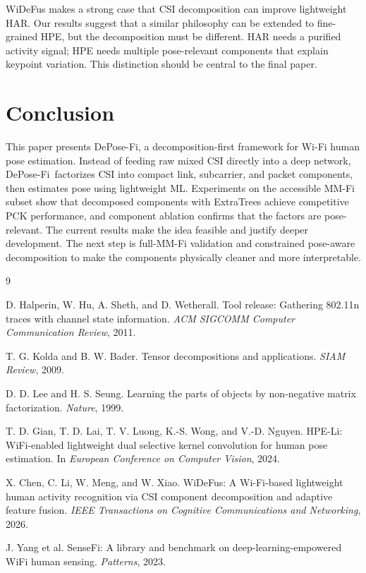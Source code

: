 \documentclass[letterpaper]{article}
\newcommand{\method}{DePose-Fi}
\begin{document}
WiDeFus makes a strong case that CSI decomposition can improve lightweight HAR. Our results suggest that a similar philosophy can be extended to fine-grained HPE, but the decomposition must be different. HAR needs a purified activity signal; HPE needs multiple pose-relevant components that explain keypoint variation. This distinction should be central to the final paper.

\section{Conclusion}

This paper presents \method, a decomposition-first framework for Wi-Fi human pose estimation. Instead of feeding raw mixed CSI directly into a deep network, \method\ factorizes CSI into compact link, subcarrier, and packet components, then estimates pose using lightweight ML. Experiments on the accessible MM-Fi subset show that decomposed components with ExtraTrees achieve competitive PCK performance, and component ablation confirms that the factors are pose-relevant. The current results make the idea feasible and justify deeper development. The next step is full-MM-Fi validation and constrained pose-aware decomposition to make the components physically cleaner and more interpretable.


\begin{thebibliography}{9}

D. Halperin, W. Hu, A. Sheth, and D. Wetherall.
\newblock Tool release: Gathering 802.11n traces with channel state information.
\newblock \emph{ACM SIGCOMM Computer Communication Review}, 2011.

T. G. Kolda and B. W. Bader.
\newblock Tensor decompositions and applications.
\newblock \emph{SIAM Review}, 2009.

D. D. Lee and H. S. Seung.
\newblock Learning the parts of objects by non-negative matrix factorization.
\newblock \emph{Nature}, 1999.

T. D. Gian, T. D. Lai, T. V. Luong, K.-S. Wong, and V.-D. Nguyen.
\newblock HPE-Li: WiFi-enabled lightweight dual selective kernel convolution for human pose estimation.
\newblock In \emph{European Conference on Computer Vision}, 2024.

X. Chen, C. Li, W. Meng, and W. Xiao.
\newblock WiDeFus: A Wi-Fi-based lightweight human activity recognition via CSI component decomposition and adaptive feature fusion.
\newblock \emph{IEEE Transactions on Cognitive Communications and Networking}, 2026.

J. Yang et al.
\newblock SenseFi: A library and benchmark on deep-learning-empowered WiFi human sensing.
\newblock \emph{Patterns}, 2023.

\end{thebibliography}
\end{document}
